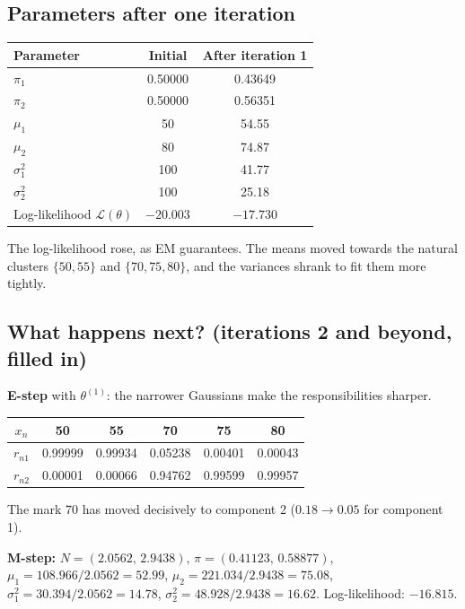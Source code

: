 \documentclass[11pt,a4paper]{article}
\newcommand{\LL}{\mathcal{L}}
\begin{document}
\subsection{Parameters after one iteration}

\begin{center}
\begin{tabular}{@{}lcc@{}}
\toprule
Parameter & Initial & After iteration 1\\
\midrule
$\pi_1$ & 0.50000 & 0.43649\\
$\pi_2$ & 0.50000 & 0.56351\\
$\mu_1$ & 50 & 54.55\\
$\mu_2$ & 80 & 74.87\\
$\sigma_1^2$ & 100 & 41.77\\
$\sigma_2^2$ & 100 & 25.18\\
Log-likelihood $\LL(\theta)$ & $-20.003$ & $-17.730$\\
\bottomrule
\end{tabular}
\end{center}
The log-likelihood rose, as EM guarantees. The means moved towards the natural clusters $\{50,55\}$ and $\{70,75,80\}$, and the variances shrank to fit them more tightly.

\subsection{What happens next? (iterations 2 and beyond, filled in)}

\begin{example}
\textbf{E-step} with $\theta^{(1)}$: the narrower Gaussians make the responsibilities sharper.
\begin{center}
\begin{tabular}{@{}cccccc@{}}
\toprule
$x_n$ & 50 & 55 & 70 & 75 & 80\\
\midrule
$r_{n1}$ & 0.99999 & 0.99934 & 0.05238 & 0.00401 & 0.00043\\
$r_{n2}$ & 0.00001 & 0.00066 & 0.94762 & 0.99599 & 0.99957\\
\bottomrule
\end{tabular}
\end{center}
The mark $70$ has moved decisively to component 2 ($0.18\to0.05$ for component 1).

\textbf{M-step:}
$N=(2.0562,\,2.9438)$, $\pi=(0.41123,\,0.58877)$,
$\mu_1=108.966/2.0562=52.99$, $\mu_2=221.034/2.9438=75.08$,
$\sigma_1^2=30.394/2.0562=14.78$, $\sigma_2^2=48.928/2.9438=16.62$.
Log-likelihood: $-16.815$.
\end{example}
\end{document}

